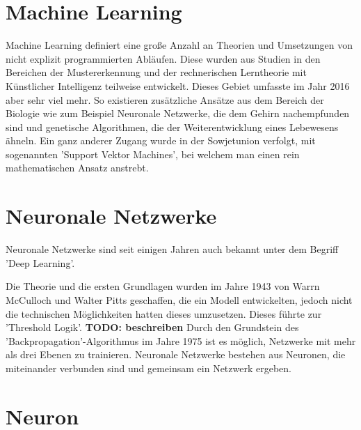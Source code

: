 \section{Machine Learning}
\label{sec:Machine Learning}

Machine Learning definiert eine große Anzahl an Theorien und Umsetzungen von nicht explizit programmierten Abläufen. 
Diese wurden aus Studien in den Bereichen der Mustererkennung und der rechnerischen Lerntheorie mit Künstlicher Intelligenz teilweise entwickelt. 
Dieses Gebiet umfasste im Jahr 2016 aber sehr viel mehr. 
So existieren zusätzliche Ansätze aus dem Bereich der Biologie wie zum Beispiel Neuronale Netzwerke, die dem Gehirn nachempfunden sind und genetische Algorithmen, die der Weiterentwicklung eines Lebewesens ähneln. 
Ein ganz anderer Zugang wurde in der Sowjetunion verfolgt, mit sogenannten 'Support Vektor Machines', bei welchem man einen rein mathematischen Ansatz anstrebt. \cite{lampropoulos2015machine}

\section{Neuronale Netzwerke}

Neuronale Netzwerke sind seit einigen Jahren auch bekannt unter dem Begriff 'Deep Learning'. \newline

\noindent 
Die Theorie und die ersten Grundlagen wurden im Jahre 1943 von Warrn McCulloch und Walter Pitts geschaffen, die ein Modell entwickelten, jedoch nicht die technischen Möglichkeiten hatten dieses umzusetzen.
Dieses %
führte zur 'Threshold Logik'. \textbf{TODO: beschreiben}
Durch den Grundstein des 'Backpropagation'-Algorithmus im Jahre 1975 ist es möglich, Netzwerke mit mehr als drei Ebenen zu trainieren. 
Neuronale Netzwerke bestehen aus Neuronen, die miteinander verbunden sind und gemeinsam ein Netzwerk ergeben. \cite{AI3} %



\section{Neuron}
\label{sec:Neuron}

